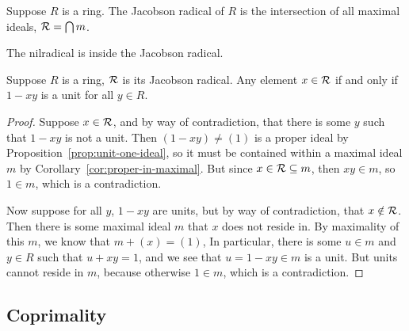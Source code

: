 \begin{definition}
    Suppose \(R\) is a ring.
    The Jacobson radical of \(R\) is the intersection of all maximal ideals,
    \(\mathcal{R} = \bigcap m\).
\end{definition}
\begin{remark}
    The nilradical is inside the Jacobson radical.
\end{remark}
\begin{lemma}
    Suppose \(R\) is a ring, \(\mathcal{R}\) is its Jacobson radical.
    Any element \(x \in \mathcal{R}\) if and only if \(1 - xy\) is a unit for all \(y \in R\).
\end{lemma}
\begin{proof}
    Suppose \(x \in \mathcal{R}\),
    and by way of contradiction, that there is some \(y\) such that \(1 - xy\) is not a unit.
    Then \((1-xy) \neq (1)\) is a proper ideal by Proposition~\ref{prop:unit-one-ideal},
    so it must be contained within a maximal ideal \(m\) by Corollary~\ref{cor:proper-in-maximal}.
    But since \(x \in \mathcal{R} \subseteq m\), then \(xy \in m\), so \(1 \in m\),
    which is a contradiction.

    Now suppose for all \(y\), \(1 - xy\) are units,
    but by way of contradiction, that \(x \notin \mathcal{R}\).
    Then there is some maximal ideal \(m\) that \(x\) does not reside in.
    By maximality of this \(m\), we know that \(m + (x) = (1)\),
    In particular, there is some \(u \in m\) and \(y \in R\) such that \(u + xy = 1\),
    and we see that \(u = 1-xy \in m\) is a unit.
    But units cannot reside in \(m\), because otherwise \(1 \in m\),
    which is a contradiction.
\end{proof}

\subsection*{Coprimality}

